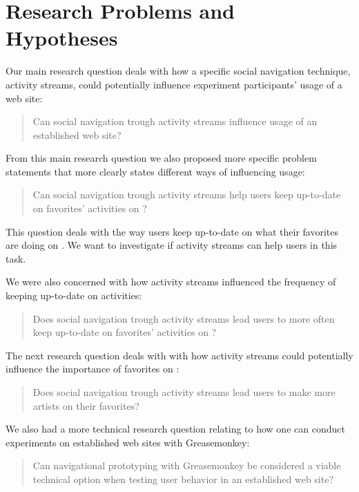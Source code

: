 \section{Research Problems and Hypotheses}

Our main research question deals with how a specific social navigation
technique, activity streams, could potentially influence experiment
participants' usage of a web site:

\begin{quote}
  Can social navigation trough activity streams influence
  usage of an established web site?
\end{quote}

From this main research question we also proposed more specific problem
statements that more clearly states different ways of influencing usage:

\begin{quote}
  Can social navigation trough activity streams help users keep
  up-to-date on favorites' activities on \urort{}?
\end{quote}

This question deals with the way users keep up-to-date on what their favorites
are doing on \urort{}. We want to investigate if activity streams can help
users in this task.

We were also concerned with how activity streams influenced the
frequency of keeping up-to-date on activities:

\begin{quote}
  Does social navigation trough activity streams lead users to more often keep
  up-to-date on favorites' activities on \urort{}?
\end{quote}

The next research question deals with with how activity streams could
potentially influence the importance of favorites on \urort{}:

\begin{quote}
  Does social navigation trough activity streams lead users to make
  more artists on \urort{} their favorites?
\end{quote}

We also had a more technical research question relating to how one can
conduct experiments on established web sites with Greasemonkey:

\begin{quote}
  Can navigational prototyping with Greasemonkey be considered a
  viable technical option when testing user behavior in an
  established web site?
\end{quote}

